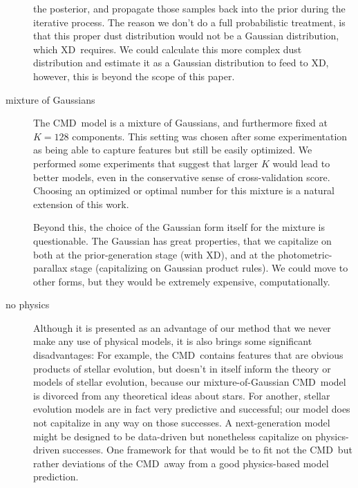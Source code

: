 \documentclass[modern]{aastex61}
\newcommand{\acronym}[1]{{\small{#1}}}
\newcommand{\xd}{\acronym{XD}}
\newcommand{\cmd}{\acronym{CMD}}
\begin{document}
\begin{description}
  the posterior, and propagate those samples back into the prior
  during the iterative process. The reason we don't do a full
  probabilistic treatment, is that this proper dust distribution would
  not be a Gaussian distribution, which \xd\ requires. We could
  calculate this more complex dust distribution and estimate it as a
  Gaussian distribution to feed to \xd, however, this is beyond the
  scope of this paper.
\item[mixture of Gaussians] The \cmd\ model is a mixture of Gaussians,
  and furthermore fixed at $K=128$ components. This setting was chosen
  after some experimentation as being able to capture features but still
  be easily optimized. We performed some experiments
  that suggest that larger $K$ would lead to better models, even in the
  conservative sense of cross-validation score. Choosing an optimized or
  optimal number for this mixture is a natural extension of this work.

  Beyond this, the choice of the Gaussian form itself for the mixture is
  questionable. The Gaussian has great properties, that we capitalize on
  both at the prior-generation stage (with \xd), and at the photometric-parallax
  stage (capitalizing on Gaussian product rules). We could move to other
  forms, but they would be extremely expensive, computationally.
\item[no physics] Although it is presented as an advantage of our
  method that we never make any use of physical models, it is also
  brings some significant disadvantages: For example, the \cmd\ contains
  features that are obvious products of stellar evolution, but doesn't in
  itself inform the theory or models of stellar evolution, because our
  mixture-of-Gaussian \cmd\ model is divorced from any theoretical ideas
  about stars. For another, stellar evolution models are in fact very
  predictive and successful; our model does not capitalize in any way on
  those successes. A next-generation model might be designed to be data-driven
  but nonetheless capitalize on physics-driven successes. One framework
  for that would be to fit not the \cmd\ but rather deviations of the \cmd\ away
  from a good physics-based model prediction.
\end{description}
\end{document}
